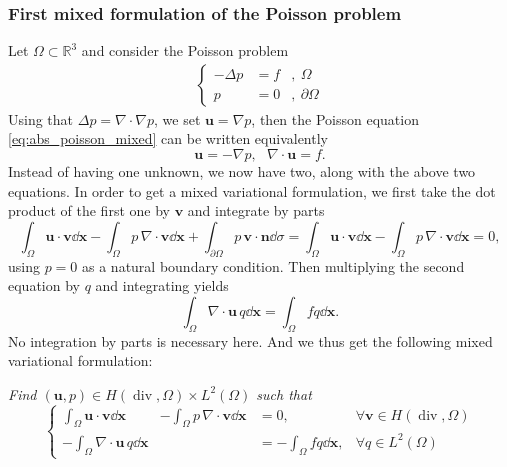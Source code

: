 \subsubsection*{First mixed formulation of the Poisson problem}
Let $\Omega \subset \mathbb{R}^3$ and consider the Poisson problem
\begin{align}
  \left\{ 
  \begin{array}{clr}
    -\Delta p & =f & ,~\Omega    \\
    p         & =0 & ,~\partial \Omega
  \end{array} \right.
  \label{eq:abs_poisson_mixed}
\end{align}
Using that $\Delta p = \nabla\cdot\nabla p$, we set $ \mathbf{u}=\nabla p$, then the Poisson equation \eqref{eq:abs_poisson_mixed} can be written equivalently
$$ \mathbf{u}=-\nabla p, ~~~ \nabla\cdot \mathbf{u}= f.$$
Instead of having one unknown, we now have two, along with the above two equations.
In order to get a mixed variational formulation, we first take the dot product of the first one by $ \mathbf{v}$ and integrate by parts
$$\int_{\Omega} \mathbf{u}\cdot \mathbf{v}\dd \mathbf{x} -\int_{\Omega} p\,\nabla\cdot \mathbf{v}\dd \mathbf{x} +
\int_{\partial\Omega} p \,  \mathbf{v}\cdot \mathbf{n}\dd \sigma=
\int_{\Omega} \mathbf{u}\cdot \mathbf{v}\dd \mathbf{x} -\int_{\Omega} p\,\nabla\cdot \mathbf{v}\dd \mathbf{x}=0,$$
using $p=0$ as a natural boundary condition. Then multiplying the second equation by $q$ and integrating yields
$$\int_{\Omega} \nabla\cdot\mathbf{u} \, q \dd \mathbf{x} = \int_{\Omega} f q \dd \mathbf{x}.
$$
No integration by parts is necessary here. And we thus get the following mixed variational formulation:
\begin{tcolorbox}
  {\em Find $(\mathbf{u},p) \in H(\operatorname{div},\Omega)\times L^2(\Omega)$ such that}
  \begin{equation}
    \left\{ 
    \begin{array}{llll}
      \int_{\Omega} \mathbf{u}\cdot \mathbf{v}\dd \mathbf{x} &- \int_{\Omega} p\,\nabla\cdot \mathbf{v}\dd \mathbf{x} &=0, & \forall \mathbf{v}\in H(\operatorname{div},\Omega) \\
      - \int_{\Omega} \nabla\cdot\mathbf{u} \, q \dd \mathbf{x} &  &= - \int_{\Omega} f q \dd \mathbf{x}, & \forall q\in L^2(\Omega)
    \end{array} \right.
    \label{eq:abs_var_mixed_poisson_1}
  \end{equation}
\end{tcolorbox}
%
